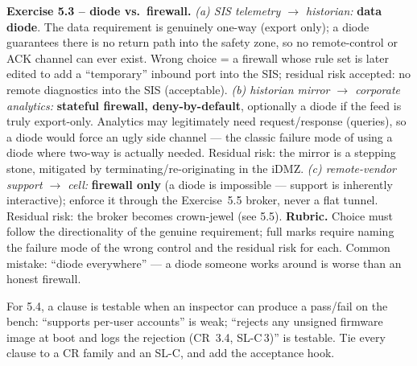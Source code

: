 \documentclass[11pt,a4paper]{article}
\begin{document}
\begin{solutionbox}
\textbf{Exercise 5.3 -- diode vs.\ firewall.}
\emph{(a) SIS telemetry $\to$ historian:} \textbf{data diode}. The data requirement is genuinely one-way (export only); a diode guarantees there is no return path into the safety zone, so no remote-control or ACK channel can ever exist. Wrong choice = a firewall whose rule set is later edited to add a ``temporary'' inbound port into the SIS; residual risk accepted: no remote diagnostics into the SIS (acceptable). \emph{(b) historian mirror $\to$ corporate analytics:} \textbf{stateful firewall, deny-by-default}, optionally a diode if the feed is truly export-only. Analytics may legitimately need request/response (queries), so a diode would force an ugly side channel --- the classic failure mode of using a diode where two-way is actually needed. Residual risk: the mirror is a stepping stone, mitigated by terminating/re-originating in the iDMZ. \emph{(c) remote-vendor support $\to$ cell:} \textbf{firewall only} (a diode is impossible --- support is inherently interactive); enforce it through the Exercise~5.5 broker, never a flat tunnel. Residual risk: the broker becomes crown-jewel (see 5.5). \textbf{Rubric.} Choice must follow the directionality of the genuine requirement; full marks require naming the failure mode of the wrong control and the residual risk for each. Common mistake: ``diode everywhere'' --- a diode someone works around is worse than an honest firewall.
\end{solutionbox}

\begin{hintbox}
For 5.4, a clause is testable when an inspector can produce a pass/fail on the bench: ``supports per-user accounts'' is weak; ``rejects any unsigned firmware image at boot and logs the rejection (CR~3.4, SL-C\,3)'' is testable. Tie every clause to a CR family and an SL-C, and add the acceptance hook.
\end{hintbox}
\end{document}
